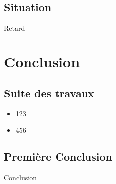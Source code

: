 \documentclass{beamer}
\begin{document}
\subsection*{Situation}
\begin{frame}
Retard
\end{frame}


\section{Conclusion}
\subsection*{Suite des travaux}
\begin{frame}{}
  \begin{itemize}
  \item 123
  \item 456
  \end{itemize}
\end{frame}

\subsection*{Première Conclusion}
\begin{frame}{Conclusion}

\end{frame}
\end{document}
